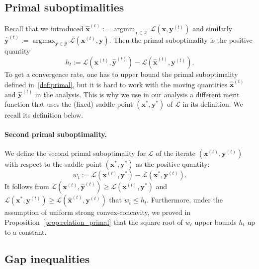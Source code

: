 \documentclass[twoside]{article}
\renewcommand{\L}{\mathcal{L}}
\newcommand{\X}{\mathcal{X}}
\newcommand{\Y}{\mathcal{Y}}
\newcommand{\x}{\bm{x}}
\newcommand{\y}{\bm{y}}
\newcommand{\xt}{\bm{x}^{(t)}}
\newcommand{\yt}{\bm{y}^{(t)}}
\newcommand{\xtm}{\widehat{\bm{x}}^{(t)}}
\newcommand{\ytm}{\widehat{\bm{y}}^{(t)}}
\newcommand{\wt}{w_t}
\DeclareMathOperator*{\argmin}{\arg\min}
\DeclareMathOperator*{\argmax}{\arg\max}
\newcommand{\0}{\mathbf{0}} %
\begin{document}
\subsection{Primal suboptimalities}
  Recall that we introduced $\xtm := \argmin_{\x \in \X} \L(\x, \yt)$ 
  and similarly $\ytm := \argmax_{\y \in \Y} \L(\xt, \y).$
  Then the primal suboptimality is the positive quantity 
    \begin{equation}\label{def:primal}
    h_t := \L(\xt,\ytm)- \L(\xtm,\yt). 
    \end{equation}
  To get a convergence rate, one has to upper bound the primal suboptimality defined in~\eqref{def:primal}, but it is hard to work with the moving quantities $\xtm$ and $\ytm$ in the analysis. This is why we use in our analysis a different merit function that uses the (fixed) saddle point $(\x^*,\y^*)$ of $\L$ in its definition. We recall its definition below.

   \paragraph{Second primal suboptimality.} %
   \label{par:second_primal_gap}
  We define the second primal suboptimality for $\L$ of the iterate $(\xt, \yt)$ with respect to the saddle point $(\x^*,\y^*)$ as the positive quantity: 
    \begin{equation} 
  \label{def:primal2}
    \wt := \L(\xt,\y^*)- \L(\x^*,\yt). 
    \end{equation}
  It follows from $\L(\xt,\ytm) \geq \L(\xt,\y^*)$ and $\L(\x^*,\yt) \geq \L(\xtm,\yt)$ that $w_t \leq h_t$. 
  Furthermore, under the assumption of uniform strong convex-concavity, we proved in Proposition~\ref{prop:relation_primal} that the square root of $w_t$ upper bounds $h_t$ up to a constant.



    


\subsection{Gap inequalities} \label{app:gapInequalities}
\end{document}

